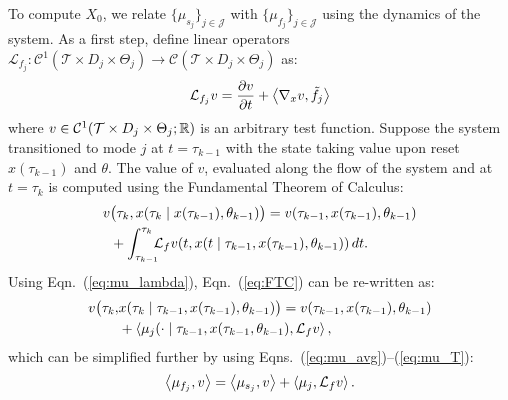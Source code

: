 To compute $X_0$, we relate $\{\mu_{s_j}\}_{j\in \mathcal J}$ with $\{\mu_{f_j}\}_{j\in \mathcal J}$ using the dynamics of the system.
As a first step, define linear operators {$\mathcal L_{ f_j}\colon \mathcal C^1(\mathcal T\times D_j\times \Theta_j)\rightarrow \mathcal C(\mathcal T\times D_j\times \Theta_j)$} as:
\begin{align}
      \mathcal L_{f_j}v=\frac{\partial v}{\partial t}+\left\langle \nabla_x v,\tilde f_j\right\rangle
    \label{eq:Lv}
\end{align}
where $v\in \mathcal C^1(\mathcal T\times D_j\times \Theta_j;\mathbb{R})$ is an arbitrary test function.
Suppose the system transitioned to mode $j$ at \mbox{$t=\tau_{k-1}$} with the state taking value upon reset $x(\tau_{k-1})$ and $\theta$.
The value of $v$, evaluated along the flow of the system and at $t=\tau_{k}$ is computed using the Fundamental Theorem of Calculus:
\begin{align}
\begin{aligned}
    v& \big(\tau_k,x(\tau_{k}\mid x(\tau_{k-1}),\theta_{k-1})\big)=v(\tau_{k-1},x(\tau_{k-1}),\theta_{k-1})\\
    &+\int_{\tau_{k-1}}^{\tau_{k}}\hspace*{-2mm}\mathcal L_{f}v(t,x(t\mid \tau_{k-1},x(\tau_{k-1}),\theta_{k-1}))\,dt.
\end{aligned}
\label{eq:FTC}
\end{align}
Using Eqn.~(\ref{eq:mu_lambda}), Eqn.~(\ref{eq:FTC}) can be re-written as:
\small
\begin{align}
\begin{aligned}
    v\big(\tau_k,&x(\tau_{k}\mid \tau_{k-1},x(\tau_{k-1}),\theta_{k-1})\big)=v(\tau_{k-1},x(\tau_{k-1}),\theta_{k-1})\\
    &+\left\langle \mu_j(\cdot\mid \tau_{k-1},x(\tau_{k-1},\theta_{k-1}),\mathcal L_{ f}v\right\rangle,
\end{aligned}
\end{align}
\normalsize
which can be simplified further by using Eqns.~(\ref{eq:mu_avg})--(\ref{eq:mu_T}):
\begin{align}
  \left\langle \mu_{f_j},v\right\rangle=\left\langle \mu_{s_j},v\right\rangle+\left\langle \mu_{j},\mathcal L_{f}v\right\rangle.
  \label{eq:liouville_1}
\end{align}

